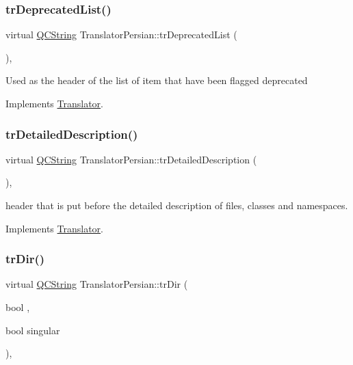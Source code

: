 \subsubsection{\texorpdfstring{trDeprecatedList()}{trDeprecatedList()}}
{\footnotesize\ttfamily virtual \mbox{\hyperlink{class_q_c_string}{Q\+C\+String}} Translator\+Persian\+::tr\+Deprecated\+List (\begin{DoxyParamCaption}{ }\end{DoxyParamCaption})\hspace{0.3cm}{\ttfamily [inline]}, {\ttfamily [virtual]}}

Used as the header of the list of item that have been flagged deprecated 

Implements \mbox{\hyperlink{class_translator}{Translator}}.

\mbox{\label{class_translator_persian_a8f465f0ef7a9a77fa88444161bfac6b9}} 
\subsubsection{\texorpdfstring{trDetailedDescription()}{trDetailedDescription()}}
{\footnotesize\ttfamily virtual \mbox{\hyperlink{class_q_c_string}{Q\+C\+String}} Translator\+Persian\+::tr\+Detailed\+Description (\begin{DoxyParamCaption}{ }\end{DoxyParamCaption})\hspace{0.3cm}{\ttfamily [inline]}, {\ttfamily [virtual]}}

header that is put before the detailed description of files, classes and namespaces. 

Implements \mbox{\hyperlink{class_translator}{Translator}}.

\mbox{\label{class_translator_persian_a7ed31c1aaa90edc6cceb4ab37c873462}} 
\subsubsection{\texorpdfstring{trDir()}{trDir()}}
{\footnotesize\ttfamily virtual \mbox{\hyperlink{class_q_c_string}{Q\+C\+String}} Translator\+Persian\+::tr\+Dir (\begin{DoxyParamCaption}\item[{bool}]{,  }\item[{bool}]{singular }\end{DoxyParamCaption})\hspace{0.3cm}{\ttfamily [inline]}, {\ttfamily [virtual]}}

